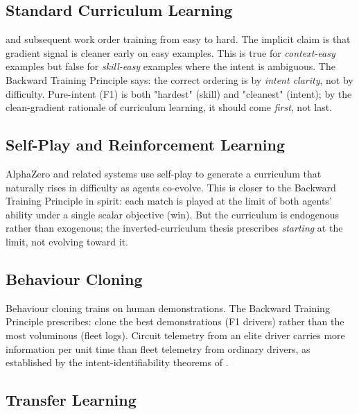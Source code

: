 \documentclass[11pt,twocolumn,a4paper]{article}
\begin{document}
\subsection{Standard Curriculum Learning}

\citet{bengio2009curriculum} and subsequent work \cite{soviany2022curriculum,graves2017automated} order training from easy to hard. The implicit claim is that gradient signal is cleaner early on easy examples. This is true for \emph{context-easy} examples but false for \emph{skill-easy} examples where the intent is ambiguous. The Backward Training Principle says: the correct ordering is by \emph{intent clarity}, not by difficulty. Pure-intent (F1) is both "hardest" (skill) and "cleanest" (intent); by the clean-gradient rationale of curriculum learning, it should come \emph{first}, not last.

\subsection{Self-Play and Reinforcement Learning}

AlphaZero \cite{silver2018general} and related systems use self-play to generate a curriculum that naturally rises in difficulty as agents co-evolve. This is closer to the Backward Training Principle in spirit: each match is played at the limit of both agents' ability under a single scalar objective (win). But the curriculum is endogenous rather than exogenous; the inverted-curriculum thesis prescribes \emph{starting} at the limit, not evolving toward it.

\subsection{Behaviour Cloning}

Behaviour cloning \cite{ross2011reduction,codevilla2018endtoend,bansal2019chauffeurnet} trains on human demonstrations. The Backward Training Principle prescribes: clone the best demonstrations (F1 drivers) rather than the most voluminous (fleet logs). Circuit telemetry from an elite driver carries more information per unit time than fleet telemetry from ordinary drivers, as established by the intent-identifiability theorems of \cite{sachikonye2026driving}.

\subsection{Transfer Learning}
\end{document}
